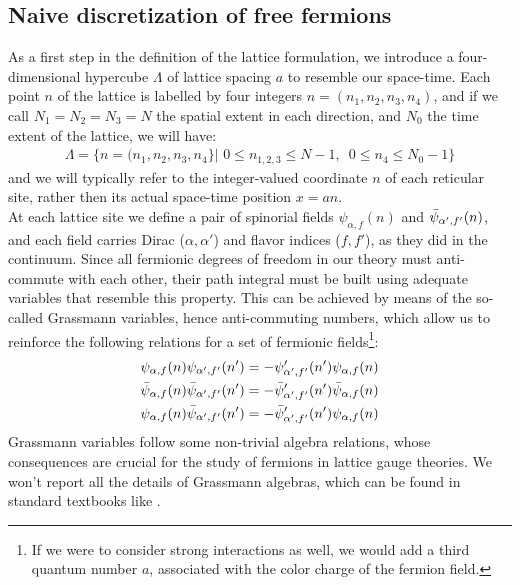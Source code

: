 \subsection{Naive discretization of free fermions}
As a first step in the definition of the lattice formulation, we introduce a four-dimensional hypercube $\Lambda$ of lattice spacing $a$ to resemble our space-time. Each point $n$ of the lattice is labelled by four integers $n = (n_1, n_2, n_3, n_4)$, and if we call $N_1 = N_2 = N_3 = N$ the spatial extent in each direction, and $N_0$ the time extent of the lattice, we will have:
\begin{equation}\label{lattice}
\begin{split}
        \Lambda = \{ n = (n_1, n_2, n_3, n_4 \} | 
        \,\, 0 \leq n_{1,2,3} \leq N - 1, \,\,\,
        0 \leq n_4 \leq N_0 - 1 \}
\end{split}
\end{equation}
and we will typically refer to the integer-valued coordinate $n$ of each reticular site, rather then its actual space-time position $x = an.$
\\ At each lattice site we define a pair of spinorial fields $\psi_{\alpha, f}(n)$ and $\Bar{\psi}_{\alpha', f'}(n)$, and each field carries Dirac ($\alpha, \alpha'$) and flavor indices ($f, f'$), as they did in the continuum. Since all fermionic degrees of freedom in our theory must anti-commute with each other, their path integral must be built using adequate variables that resemble this property. This can be achieved by means of the so-called Grassmann variables, hence anti-commuting numbers, which allow us to reinforce the following relations for a set of fermionic fields\footnote{If we were to consider strong interactions as well, we would add a third quantum number $a$, associated with the color charge of the fermion field.}:
\begin{equation}
    \begin{split}
        \psi_{\alpha, f}(n) \psi_{\alpha', f'}(n') = - \psi_{\alpha', f'}'(n') \psi_{\alpha, f}(n) \\
        \Bar{\psi}_{\alpha, f}(n) \Bar{\psi}_{\alpha', f'}(n') = - \Bar{\psi}_{\alpha', f'}'(n') \Bar{\psi}_{\alpha, f}(n) \\
        \psi_{\alpha, f}(n) \Bar{\psi}_{\alpha', f'}(n') = - \Bar{\psi}_{\alpha', f'}'(n') \psi_{\alpha, f}(n) 
    \end{split}
\end{equation}
Grassmann variables follow some non-trivial algebra relations, whose consequences are crucial for the study of fermions in lattice gauge theories. We won't report all the details of Grassmann algebras, which can be found in standard textbooks like \cite{Rothe:1992nt, Gattringer:2010zz}.
